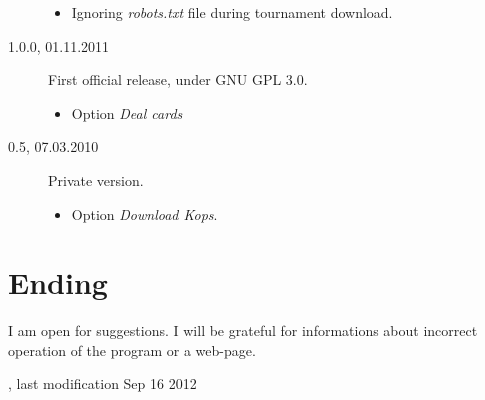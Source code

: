 \documentclass[polish,a4paper,11pt,oneside]{article}
\begin{document}
\begin{description}
\begin{itemize}
  \item Ignoring {\em robots.txt} file during tournament download.
  \end{itemize}
\item[1.0.0, 01.11.2011]
  First official release, under GNU GPL 3.0.
  \begin{itemize}
  \item Option {\em Deal cards}
  \end{itemize}
\item[0.5, 07.03.2010]
  Private version.
  \begin{itemize}
  \item Option {\em Download Kops}.
  \end{itemize}
\end{description}

\section{Ending}

I am open for suggestions. I will be grateful for informations about incorrect operation of the program or a web-page.

{\setlength{\parindent}{0pt}\small{}
, last modification Sep 16 2012}
\end{document}
